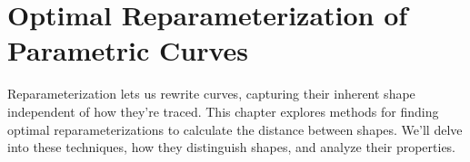 \chapter{Optimal Reparameterization of Parametric Curves}
\label{ch:optimal-reparameterization}

Reparameterization lets us rewrite curves, capturing their inherent shape independent of how they're traced. This chapter explores methods for finding optimal reparameterizations to calculate the distance between shapes. We'll delve into these techniques, how they distinguish shapes, and analyze their properties.









% 

